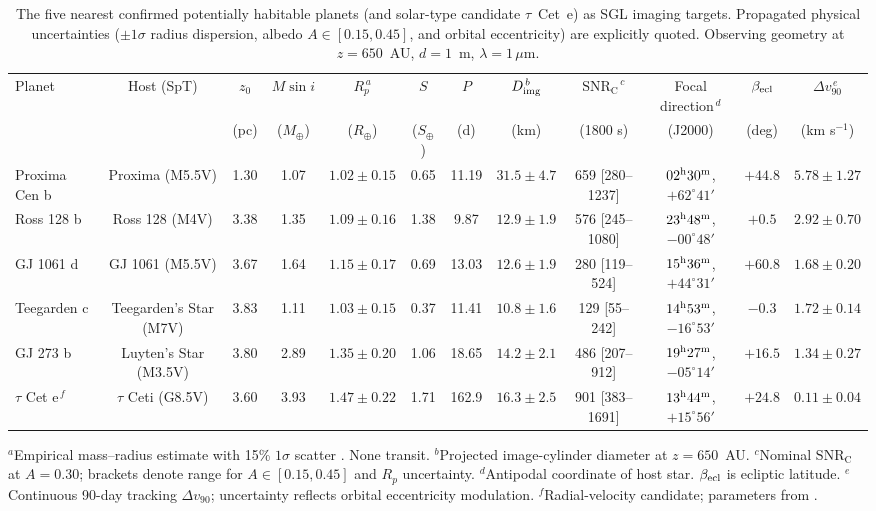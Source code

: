 \documentclass[twocolumn]{emulateapj}
\begin{document}
\begin{table}[t]
\centering
\caption{The five nearest confirmed potentially habitable planets (and
solar-type candidate $\tau$~Cet~e) as SGL imaging targets. Propagated physical
uncertainties ($\pm1\sigma$ radius dispersion, albedo $A\in[0.15,0.45]$, and orbital eccentricity)
are explicitly quoted. Observing geometry at $z=650$~AU, $d=1$~m, $\lambda=1\,\mu$m.}
\label{tab:targets}
\footnotesize
\setlength{\tabcolsep}{2.2pt}
\begin{tabular}{lccccccccccc}
\toprule
Planet & Host (SpT) & $z_0$ & $M\sin i$ & $R_p^{\,a}$ & $S$ & $P$ &
$D_{\rm img}^{\,b}$ & $\mathrm{SNR_C}^{\,c}$ & Focal direction$^{\,d}$ &
$\beta_{\rm ecl}$ & $\Delta v_{90}^{\,e}$ \\
 & & (pc) & ($M_\oplus$) & ($R_\oplus$) & ($S_\oplus$) & (d) & (km) &
(1800 s) & (J2000) & (deg) & (km s$^{-1}$) \\
\midrule
Proxima Cen b & Proxima (M5.5V) & 1.30 & 1.07 & $1.02\pm0.15$ & 0.65 & 11.19 &
$31.5\pm4.7$ & 659 [280--1237] & $02^{\rm h}30^{\rm m}$, $+62^\circ41'$ & $+44.8$ & $5.78\pm1.27$ \\
Ross 128 b & Ross 128 (M4V) & 3.38 & 1.35 & $1.09\pm0.16$ & 1.38 & 9.87 &
$12.9\pm1.9$ & 576 [245--1080] & $23^{\rm h}48^{\rm m}$, $-00^\circ48'$ & $+0.5$ & $2.92\pm0.70$ \\
GJ 1061 d & GJ 1061 (M5.5V) & 3.67 & 1.64 & $1.15\pm0.17$ & 0.69 & 13.03 &
$12.6\pm1.9$ & 280 [119--524] & $15^{\rm h}36^{\rm m}$, $+44^\circ31'$ & $+60.8$ & $1.68\pm0.20$ \\
Teegarden c & Teegarden's Star (M7V) & 3.83 & 1.11 & $1.03\pm0.15$ & 0.37 & 11.41 &
$10.8\pm1.6$ & 129 [55--242] & $14^{\rm h}53^{\rm m}$, $-16^\circ53'$ & $-0.3$ & $1.72\pm0.14$ \\
GJ 273 b & Luyten's Star (M3.5V) & 3.80 & 2.89 & $1.35\pm0.20$ & 1.06 & 18.65 &
$14.2\pm2.1$ & 486 [207--912] & $19^{\rm h}27^{\rm m}$, $-05^\circ14'$ & $+16.5$ & $1.34\pm0.27$ \\
\midrule
$\tau$ Cet e$^{\,f}$ & $\tau$ Ceti (G8.5V) & 3.60 & 3.93 & $1.47\pm0.22$ &
1.71 & 162.9 & $16.3\pm2.5$ & 901 [383--1691] & $13^{\rm h}44^{\rm m}$, $+15^\circ56'$ &
$+24.8$ & $0.11\pm0.04$ \\
\bottomrule
\end{tabular}

\vspace{1.5mm}
\parbox{0.96\textwidth}{\footnotesize
$^{a}$Empirical mass--radius estimate with 15\% $1\sigma$ scatter \citep{chenkipping17}. None transit.
$^{b}$Projected image-cylinder diameter at $z=650$~AU.
$^{c}$Nominal $\mathrm{SNR_C}$ at $A=0.30$; brackets denote range for $A\in[0.15,0.45]$ and $R_p$ uncertainty.
$^{d}$Antipodal coordinate of host star. $\beta_{\rm ecl}$ is ecliptic latitude.
$^{e}$Continuous 90-day tracking $\Delta v_{90}$; uncertainty reflects orbital eccentricity modulation.
$^{f}$Radial-velocity candidate; parameters from \citet{anglada16,bonfils18,dreizler20,dreizler24,astudillo17,feng17}.}
\end{table}
\end{document}
